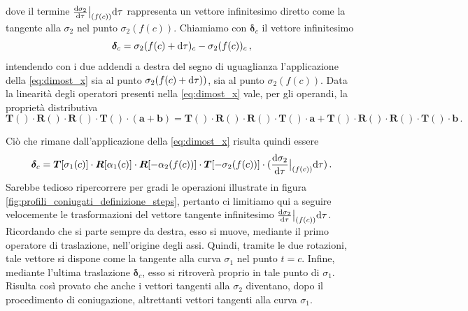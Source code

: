 \noindent dove il termine ${{\rm d}{\sigma_2}\over{{\rm d}\tau}}\bigr|_{(f(c))}
{\rm d} \tau$ rappresenta un vettore infinitesimo
diretto come la tangente alla $\sigma_2$ nel punto $\sigma_2(f(c))$.
Chiamiamo con $\bm \delta_c$ il vettore infinitesimo 
\begin{equation}
{\bm \delta_c}= \sigma_2(f(c)+{\rm d}\tau)_c- \sigma_2(f(c))_c\,,
\label{eq:vett_inf}
\end{equation}
\noindent intendendo
con i due addendi a destra del segno di uguaglianza l'applicazione della
\ref{eq:dimost_x} sia al punto $\sigma_2(f(c)+{\rm d}\tau))$, sia
al punto $\sigma_2(f(c))$. Data la linearit\`a degli operatori
presenti nella
\ref{eq:dimost_x} vale, per gli operandi, la propriet\`a distributiva
\begin{equation}
{\bm T}()\cdot{\bm R}()\cdot {\bm R}()\cdot{\bm T}()\cdot({\bm a}+{\bm b})=
{\bm T}()\cdot{\bm R}()\cdot {\bm R}()\cdot{\bm T}()\cdot{\bm a}+
{\bm T}()\cdot{\bm R}()\cdot {\bm R}()\cdot{\bm T}()\cdot{\bm b}\,.
\end{equation}

\noindent Ci\`o che rimane dall'applicazione della \ref{eq:dimost_x}
risulta quindi essere
\begin{equation}
{\bm \delta_c} =
 {\bm T}[\sigma_1(c)]\cdot {\bm R}[\alpha_1(c)]\cdot{\bm R}[-\alpha_2(f(c))]
\cdot 
 {\bm T} [-\sigma_2(f(c))]
	\cdot (
{{\rm d}{\sigma_2}\over{{\rm d}\tau}}\bigr|_{(f(c))} 
{\rm d} \tau )\,.
\label{eq:dimost_x3}
\end{equation}
\noindent Sarebbe tedioso ripercorrere per gradi le operazioni
illustrate in figura \ref{fig:profili_coniugati_definizione_steps}, pertanto ci
limitiamo qui a seguire velocemente le trasformazioni del vettore tangente infinitesimo
${{\rm d}{\sigma_2}\over{{\rm d}\tau}}\bigr|_{(f(c))}
{\rm d} \tau$. Ricordando che si parte sempre da destra, esso si muove, mediante
il primo operatore di traslazione,
nell'origine degli assi. Quindi, tramite le due rotazioni, tale vettore
si dispone come la
tangente alla curva $\sigma_1$ nel punto $t=c$. Infine,
mediante l'ultima traslazione $\bm \delta_c$, esso si ritrover\`a
proprio in tale punto
di $\sigma_1$. Risulta cos\`i provato che anche i vettori tangenti alla
$\sigma_2$ diventano, dopo il procedimento di coniugazione, altrettanti
vettori tangenti alla curva $\sigma_1$.



